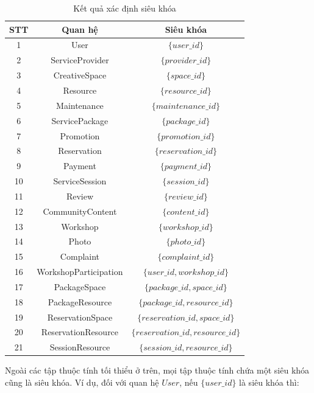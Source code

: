 \begin{table}[htbp]
	\centering
	\begin{tabular}{|c|c|c|}
		\hline
		\textbf{STT} & \textbf{Quan hệ} & \textbf{Siêu khóa} \\
		\hline
		1 & User & $\{user\_id\}$ \\
		\hline
		2 & ServiceProvider & $\{provider\_id\}$ \\
		\hline
		3 & CreativeSpace & $\{space\_id\}$ \\
		\hline
		4 & Resource & $\{resource\_id\}$ \\
		\hline
		5 & Maintenance & $\{maintenance\_id\}$ \\
		\hline
		6 & ServicePackage & $\{package\_id\}$ \\
		\hline
		7 & Promotion & $\{promotion\_id\}$ \\
		\hline
		8 & Reservation & $\{reservation\_id\}$ \\
		\hline
		9 & Payment & $\{payment\_id\}$ \\
		\hline
		10 & ServiceSession & $\{session\_id\}$ \\
		\hline
		11 & Review & $\{review\_id\}$ \\
		\hline
		12 & CommunityContent & $\{content\_id\}$ \\
		\hline
		13 & Workshop & $\{workshop\_id\}$ \\
		\hline
		14 & Photo & $\{photo\_id\}$ \\
		\hline
		15 & Complaint & $\{complaint\_id\}$ \\
		\hline
		16 & WorkshopParticipation &
		$\{user\_id,workshop\_id\}$ \\
		\hline
		17 & PackageSpace &
		$\{package\_id,space\_id\}$ \\
		\hline
		18 & PackageResource &
		$\{package\_id,resource\_id\}$ \\
		\hline
		19 & ReservationSpace &
		$\{reservation\_id,space\_id\}$ \\
		\hline
		20 & ReservationResource &
		$\{reservation\_id,resource\_id\}$ \\
		\hline
		21 & SessionResource &
		$\{session\_id,resource\_id\}$ \\
		\hline
	\end{tabular}
	\caption{Kết quả xác định siêu khóa}
\end{table}

Ngoài các tập thuộc tính tối thiểu ở trên, mọi tập thuộc tính chứa một siêu
khóa cũng là siêu khóa. Ví dụ, đối với quan hệ $User$, nếu
$\{user\_id\}$ là siêu khóa thì:


